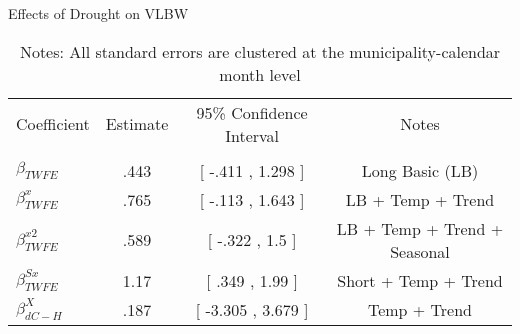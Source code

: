 \begin{table}[!ht]
\centering
\caption{Effects of Drought on VLBW}\label{tab:twfe_vlbw_test}
\renewcommand{\arraystretch}{1.5}
\fontsize{10pt}{12pt}\selectfont
\begin{tabular}{lccc}
\toprule
 \multicolumn{1}{c}{Coefficient}  &\multicolumn{1}{c}{Estimate}&\multicolumn{1}{c}{95\% Confidence Interval}&\multicolumn{1}{c}{Notes}\\\cmidrule(lr){2-2}\cmidrule(lr){3-3}\cmidrule(lr){4-4} \\
\midrule
 $ \beta_{TWFE} $ & .443  & [ -.411 ,  1.298 ] & Long Basic (LB) \\
 $ \beta^{x}_{TWFE} $ & .765  &  [ -.113 ,  1.643  ] & LB + Temp + Trend \\
 $ \beta^{x2}_{TWFE} $ & .589  & [ -.322 ,  1.5  ] & LB + Temp + Trend + Seasonal \\
 $ \beta^{Sx}_{TWFE} $ & 1.17  & [ .349 ,  1.99  ] & Short + Temp + Trend \\
 $ \beta^{X}_{dC-H} $ & .187  & [ -3.305 ,  3.679 ] & Temp + Trend \\
\bottomrule
\end{tabular}
\caption*{\footnotesize{Notes: All standard errors are clustered at the municipality-calendar month level}}
\end{table}
